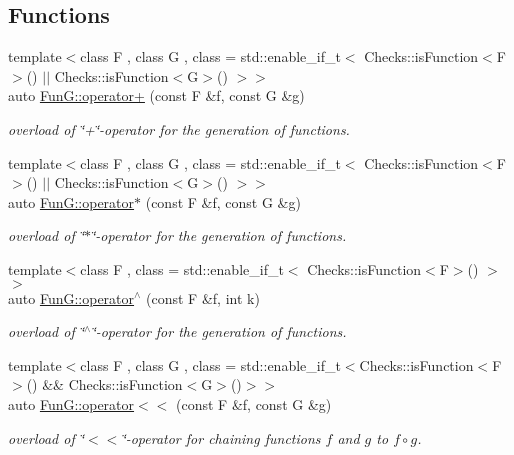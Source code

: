 \subsection*{Functions}
\begin{DoxyCompactItemize}
\item 
{\footnotesize template$<$class F , class G , class  = std\+::enable\+\_\+if\+\_\+t$<$ Checks\+::is\+Function$<$\+F$>$() $\vert$$\vert$                                      Checks\+::is\+Function$<$\+G$>$() $>$$>$ }\\auto \hyperlink{namespaceFunG_ac7f61d48ff610ec4be8ee6994d165077}{Fun\+G\+::operator+} (const F \&f, const G \&g)
\begin{DoxyCompactList}\small\item\em overload of \char`\"{}+\char`\"{}-\/operator for the generation of functions. \end{DoxyCompactList}\item 
{\footnotesize template$<$class F , class G , class  = std\+::enable\+\_\+if\+\_\+t$<$ Checks\+::is\+Function$<$\+F$>$() $\vert$$\vert$ Checks\+::is\+Function$<$\+G$>$() $>$$>$ }\\auto \hyperlink{namespaceFunG_a014be932d3b4eb377d8e60271e864438}{Fun\+G\+::operator$\ast$} (const F \&f, const G \&g)
\begin{DoxyCompactList}\small\item\em overload of \char`\"{}$\ast$\char`\"{}-\/operator for the generation of functions. \end{DoxyCompactList}\item 
{\footnotesize template$<$class F , class  = std\+::enable\+\_\+if\+\_\+t$<$ Checks\+::is\+Function$<$\+F$>$() $>$$>$ }\\auto \hyperlink{namespaceFunG_aeb22ff63cd78cb63d81b601c656da2c1}{Fun\+G\+::operator$^\wedge$} (const F \&f, int k)
\begin{DoxyCompactList}\small\item\em overload of \char`\"{}$^\wedge$\char`\"{}-\/operator for the generation of functions. \end{DoxyCompactList}\item 
{\footnotesize template$<$class F , class G , class  = std\+::enable\+\_\+if\+\_\+t$<$\+Checks\+::is\+Function$<$\+F$>$() \&\&                                     Checks\+::is\+Function$<$\+G$>$()$>$$>$ }\\auto \hyperlink{namespaceFunG_a56701b5e83b96d2d6cc5c482e36caa39}{Fun\+G\+::operator$<$$<$} (const F \&f, const G \&g)
\begin{DoxyCompactList}\small\item\em overload of \char`\"{}$<$$<$\char`\"{}-\/operator for chaining functions $f$ and $g$ to $ f \circ g $. \end{DoxyCompactList}\item 

\end{DoxyCompactItemize}
